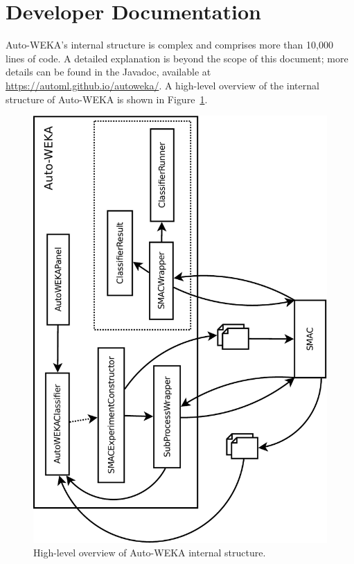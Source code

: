 \documentclass{article}
\begin{document}
\section{Developer Documentation}

Auto-WEKA's internal structure is complex and comprises more than 10,000 lines
of code. A detailed explanation is beyond the scope of this document; more
details can be found in the Javadoc, available at
\url{https://automl.github.io/autoweka/}. A high-level overview of the internal
structure of Auto-WEKA is shown in Figure~\ref{fig:devel-overview}.

\begin{figure}[!ht]
\begin{center}
\includegraphics[angle=-90,width=\textwidth]{devel-overview-crop}
\caption{High-level overview of Auto-WEKA internal structure.}
\label{fig:devel-overview}
\end{center}
\end{figure}
\end{document}
